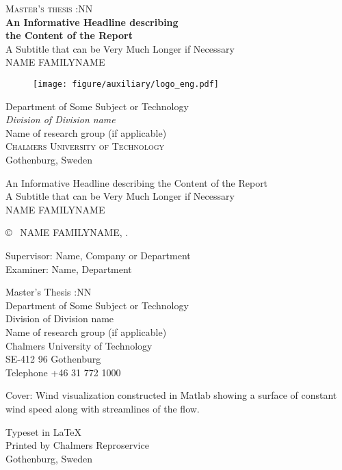 \newpage
\thispagestyle{empty}
\begin{center}
	\textsc{\large Master's thesis \the\year:NN}\\[4cm]		%
	\textbf{\Large An Informative Headline describing\\ the Content of the Report} \\[1cm]
	{\large A Subtitle that can be Very Much Longer if Necessary}\\[1cm]
	{\large NAME FAMILYNAME}
	
	\vfill	
	\begin{figure}[H]
	\centering
	\texttt{[image: figure/auxiliary/logo\_eng.pdf]} \\	
	\end{figure}	\vspace{5mm}	
	
	Department of Some Subject or Technology \\
	\emph{Division of Division name}\\
	Name of research group (if applicable)\\
	\textsc{Chalmers University of Technology} \\
	Gothenburg, Sweden \the\year \\
\end{center}


\newpage
\thispagestyle{plain}
\vspace*{4.5cm}
An Informative Headline describing the Content of the Report\\
A Subtitle that can be Very Much Longer if Necessary\\
NAME FAMILYNAME \setlength{\parskip}{1cm}

\copyright ~ NAME FAMILYNAME, \the\year. \setlength{\parskip}{1cm}

Supervisor: Name, Company or Department\\
Examiner: Name, Department \setlength{\parskip}{1cm}

Master's Thesis \the\year:NN\\	%
Department of Some Subject or Technology\\
Division of Division name\\
Name of research group (if applicable)\\
Chalmers University of Technology\\
SE-412 96 Gothenburg\\
Telephone +46 31 772 1000 \setlength{\parskip}{0.5cm}

\vfill
Cover: Wind visualization constructed in Matlab showing a surface of constant wind speed along with streamlines of the flow. \setlength{\parskip}{0.5cm}

Typeset in \LaTeX \tagtemp\\
Printed by Chalmers Reproservice\\
Gothenburg, Sweden \the\year

